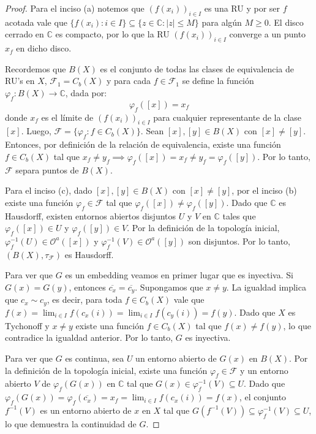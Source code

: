\documentclass{article}
\theoremstyle{plain}
\theoremstyle{definition}
\begin{document}
\begin{proof}
    Para el inciso (a) notemos que \( {(f(x_i))}_{i \in I} \) es una RU y por ser \( f \) acotada vale que \( \{ f(x_i) : i \in I \} \subseteq \{ z \in \mathbb{C} : |z| \leq M \} \) para algún \( M \geq 0 \).
    El disco cerrado en \( \mathbb{C} \) es compacto, por lo que la RU \( {(f(x_i))}_{i \in I} \) converge a un punto \( x_f \) en dicho disco.

    Recordemos que \( B(X) \) es el conjunto de todas las clases de equivalencia de RU's en \( X \), \( \mathcal{F}_1 = C_b(X) \) y para cada \( f \in \mathcal{F}_1 \) se define la función \( \varphi_f : B(X) \to \mathbb{C} \), dada por:
    \[
        \varphi_f([x]) = x_f
    \]
    donde \( x_f \) es el límite de \( {(f(x_i))}_{i \in I} \) para cualquier representante de la clase \( [x] \). Luego, \( \mathcal{F} = \{ \varphi_f : f \in C_b(X) \} \).
    Sean \( [x], [y] \in B(X) \) con \( [x] \neq [y] \). Entonces, por definición de la relación de equivalencia, existe una función \( f \in C_b(X) \) tal que
    \( x_f \neq y_f \implies \varphi_f([x]) = x_f \neq y_f = \varphi_f([y]) \). Por lo tanto, \( \mathcal{F} \) separa puntos de \( B(X) \).

    Para el inciso (c), dado \( [x], [y] \in B(X) \) con \( [x] \neq [y] \), por el inciso (b) existe una función \( \varphi_f \in \mathcal{F} \) tal que \( \varphi_f([x]) \neq \varphi_f([y]) \).
    Dado que \( \mathbb{C} \) es Hausdorff, existen entornos abiertos disjuntos \( U \) y \( V \) en \( \mathbb{C} \) tales que \( \varphi_f([x]) \in U \) y \( \varphi_f([y]) \in V \).
    Por la definición de la topología inicial, \( \varphi_f^{-1}(U) \in \mathcal{O}^a([x]) \) y \( \varphi_f^{-1}(V) \in \mathcal{O}^a([y]) \) son disjuntos. Por lo tanto, \( (B(X), \tau_{\mathcal{F}}) \) es Hausdorff.

    Para ver que \( G \) es un embedding veamos en primer lugar que es inyectiva. Si \( G(x) = G(y) \), entonces \( \overline{c_x} = \overline{c_y} \). Supongamos que \( x \neq y \).
    La igualdad implica que \( c_x \sim c_y \), es decir, para toda \( f \in C_b(X) \) vale que \( f(x) = \lim_{i \in I} f(c_x(i)) = \lim_{i \in I} f(c_y(i)) = f(y) \).
    Dado que \( X \) es Tychonoff y \( x \neq y \) existe una función \( f \in C_b(X) \) tal que \( f(x) \neq f(y) \), lo que contradice la igualdad anterior. Por lo tanto, \( G \) es inyectiva.

    Para ver que \( G \) es continua, sea \( U \) un entorno abierto de \( G(x) \) en \( B(X) \).
    Por la definición de la topología inicial, existe una función \( \varphi_f \in \mathcal{F} \) y un entorno abierto \( V \) de \( \varphi_f(G(x)) \) en \( \mathbb{C} \) tal que \( G(x) \in \varphi_f^{-1}(V) \subseteq U \).
    Dado que \( \varphi_f(G(x)) = \varphi_f(\overline{c_x}) = x_f = \lim_{i \in I} f(c_x(i)) = f(x) \), el conjunto \( f^{-1}(V) \) es un entorno abierto de \( x \) en \( X \) tal que \( G(f^{-1}(V)) \subseteq \varphi_f^{-1}(V) \subseteq U \),
    lo que demuestra la continuidad de \( G \).


\end{proof}
\end{document}
